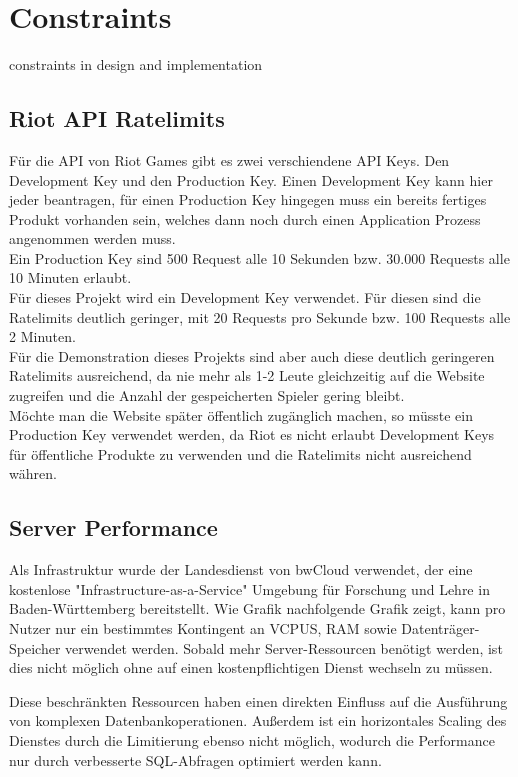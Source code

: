 \section{Constraints}
constraints in design and implementation

\subsection{Riot API Ratelimits}\label{riot-api-ratelimits}
Für die API von Riot Games gibt es zwei verschiendene API Keys. Den Development Key und den Production Key. Einen Development Key kann hier jeder beantragen, für einen Production Key hingegen muss ein bereits fertiges Produkt vorhanden sein, welches dann noch durch einen Application Prozess angenommen werden muss.\\
Ein Production Key sind 500 Request alle 10 Sekunden bzw. 30.000 Requests alle 10 Minuten erlaubt.\\
Für dieses Projekt wird ein Development Key verwendet. Für diesen sind die Ratelimits deutlich geringer, mit 20 Requests pro Sekunde bzw. 100 Requests alle 2 Minuten.\\
Für die Demonstration dieses Projekts sind aber auch diese deutlich geringeren Ratelimits ausreichend, da nie mehr als 1-2 Leute gleichzeitig auf die Website zugreifen und die Anzahl der gespeicherten Spieler gering bleibt.\\
Möchte man die Website später öffentlich zugänglich machen, so müsste ein Production Key verwendet werden, da Riot es nicht erlaubt Development Keys für öffentliche Produkte zu verwenden und die Ratelimits nicht ausreichend währen.

\subsection{Server Performance}

Als Infrastruktur wurde der Landesdienst von bwCloud verwendet, der eine kostenlose
"Infrastructure-as-a-Service" Umgebung für Forschung und Lehre in Baden-Württemberg bereitstellt.
Wie Grafik nachfolgende Grafik zeigt, kann pro Nutzer nur ein bestimmtes Kontingent an VCPUS, RAM sowie Datenträger-Speicher verwendet werden.
Sobald mehr Server-Ressourcen benötigt werden, ist dies nicht möglich ohne auf einen kostenpflichtigen Dienst wechseln zu müssen.


Diese beschränkten Ressourcen haben einen direkten Einfluss auf die Ausführung von komplexen Datenbankoperationen. Außerdem ist ein
horizontales Scaling des Dienstes durch die Limitierung ebenso nicht möglich, wodurch die Performance nur durch verbesserte SQL-Abfragen
optimiert werden kann.
